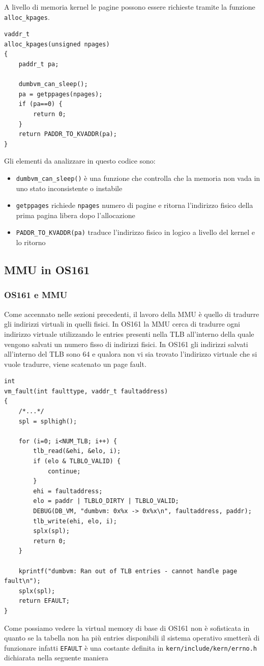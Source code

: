 A livello di memoria kernel le pagine possono essere richieste tramite la funzione \lstinline{alloc_kpages}.
\begin{lstlisting}[caption={\lstinline{alloc_kpages} in \lstinline{dumbvm.c}}]
vaddr_t
alloc_kpages(unsigned npages)
{
	paddr_t pa;

	dumbvm_can_sleep();
	pa = getppages(npages);
	if (pa==0) {
		return 0;
	}
	return PADDR_TO_KVADDR(pa);
}
\end{lstlisting}

Gli elementi da analizzare in questo codice sono:
\begin{itemize}
    \item \lstinline{dumbvm_can_sleep()} è una funzione che controlla che la memoria non vada in uno stato inconsistente o instabile
    \item \lstinline{getppages} richiede \lstinline{npages} numero di pagine e ritorna l'indirizzo fisico della prima pagina libera dopo l'allocazione
    \item \lstinline{PADDR_TO_KVADDR(pa)} traduce l'indirizzo fisico in logico a livello del kernel e lo ritorno
\end{itemize}
\newpage
\subsection{MMU in OS161}
\subsubsection{OS161 e MMU}
Come accennato nelle sezioni precedenti, il lavoro della MMU è quello di tradurre gli indirizzi virtuali in quelli fisici. In OS161 la MMU cerca di tradurre ogni indirizzo virtuale utilizzando le entries presenti nella TLB all'interno della quale vengono salvati un numero fisso di indirizzi fisici. In OS161 gli indirizzi salvati all'interno del TLB sono 64 e qualora non vi sia trovato l'indirizzo virtuale che si vuole tradurre, viene scatenato un page fault.
\begin{lstlisting}[caption=\lstinline{vm_fault} in \lstinline{dumbvm.c}]
int
vm_fault(int faulttype, vaddr_t faultaddress)
{
    /*...*/
	spl = splhigh();

	for (i=0; i<NUM_TLB; i++) {
		tlb_read(&ehi, &elo, i);
		if (elo & TLBLO_VALID) {
			continue;
		}
		ehi = faultaddress;
		elo = paddr | TLBLO_DIRTY | TLBLO_VALID;
		DEBUG(DB_VM, "dumbvm: 0x%x -> 0x%x\n", faultaddress, paddr);
		tlb_write(ehi, elo, i);
		splx(spl);
		return 0;
	}

	kprintf("dumbvm: Ran out of TLB entries - cannot handle page fault\n");
	splx(spl);
	return EFAULT;
}
\end{lstlisting}
Come possiamo vedere la virtual memory di base di OS161 non è sofisticata in quanto se la tabella non ha più entries disponibili il sistema operativo smetterà di funzionare infatti \lstinline{EFAULT} è una costante definita in \lstinline{kern/include/kern/errno.h} dichiarata nella seguente maniera 

